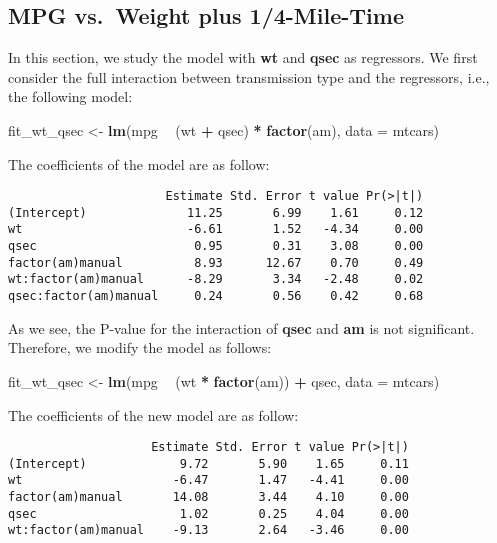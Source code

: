 \documentclass[]{article}
\newenvironment{Shaded}{\begin{snugshade}}{\end{snugshade}}
\newcommand{\KeywordTok}[1]{\textcolor[rgb]{0.13,0.29,0.53}{\textbf{#1}}}
\newcommand{\DataTypeTok}[1]{\textcolor[rgb]{0.13,0.29,0.53}{#1}}
\newcommand{\StringTok}[1]{\textcolor[rgb]{0.31,0.60,0.02}{#1}}
\newcommand{\OperatorTok}[1]{\textcolor[rgb]{0.81,0.36,0.00}{\textbf{#1}}}
\newcommand{\NormalTok}[1]{#1}
\begin{document}
\hypertarget{sec-fit-wtqsec}{\subsection{MPG vs.~Weight plus
1/4-Mile-Time}\label{sec-fit-wtqsec}}

In this section, we study the model with \textbf{wt} and \textbf{qsec}
as regressors. We first consider the full interaction between
transmission type and the regressors, i.e., the following model:

\begin{Shaded}
\begin{Highlighting}[]
\NormalTok{fit_wt_qsec <-}\StringTok{ }\KeywordTok{lm}\NormalTok{(mpg }\OperatorTok{~}\StringTok{ }\NormalTok{(wt }\OperatorTok{+}\StringTok{ }\NormalTok{qsec) }\OperatorTok{*}\StringTok{ }\KeywordTok{factor}\NormalTok{(am), }\DataTypeTok{data =}\NormalTok{ mtcars)}
\end{Highlighting}
\end{Shaded}

The coefficients of the model are as follow:

\begin{verbatim}
                      Estimate Std. Error t value Pr(>|t|)
(Intercept)              11.25       6.99    1.61     0.12
wt                       -6.61       1.52   -4.34     0.00
qsec                      0.95       0.31    3.08     0.00
factor(am)manual          8.93      12.67    0.70     0.49
wt:factor(am)manual      -8.29       3.34   -2.48     0.02
qsec:factor(am)manual     0.24       0.56    0.42     0.68
\end{verbatim}

As we see, the P-value for the interaction of \textbf{qsec} and
\textbf{am} is not significant. Therefore, we modify the model as
follows:

\begin{Shaded}
\begin{Highlighting}[]
\NormalTok{fit_wt_qsec <-}\StringTok{ }\KeywordTok{lm}\NormalTok{(mpg }\OperatorTok{~}\StringTok{ }\NormalTok{(wt }\OperatorTok{*}\StringTok{ }\KeywordTok{factor}\NormalTok{(am)) }\OperatorTok{+}\StringTok{ }\NormalTok{qsec, }\DataTypeTok{data =}\NormalTok{ mtcars)}
\end{Highlighting}
\end{Shaded}

The coefficients of the new model are as follow:

\begin{verbatim}
                    Estimate Std. Error t value Pr(>|t|)
(Intercept)             9.72       5.90    1.65     0.11
wt                     -6.47       1.47   -4.41     0.00
factor(am)manual       14.08       3.44    4.10     0.00
qsec                    1.02       0.25    4.04     0.00
wt:factor(am)manual    -9.13       2.64   -3.46     0.00
\end{verbatim}
\end{document}
